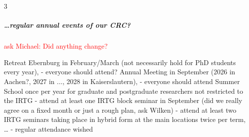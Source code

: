 \begin{multicols}{3}
    
  
    
    
    
    \subparagraph{\dots regular annual events of our CRC?} 
    \textcolor{red}{ask Michael: Did anything change?}
    
    Retreat Ebernburg in February/March (not necessarily hold for PhD students every year),
        - everyone should attend?
    Annual Meeting in September (2026 in Aachen?, 2027 in ..., 2028 in Kaiserslautern), 
        - everyone should attend
    Summer School once per year for graduate and postgraduate researchers not restricted to the IRTG
       - attend at least one 
    IRTG block seminar in September (did we really agree on a fixed month or just a rough plan, ask Wilken)
        - attend at least two
    IRTG seminars taking place in hybrid form at the main locations twice per term, \dots  
        - regular attendance wished
\end{multicols}